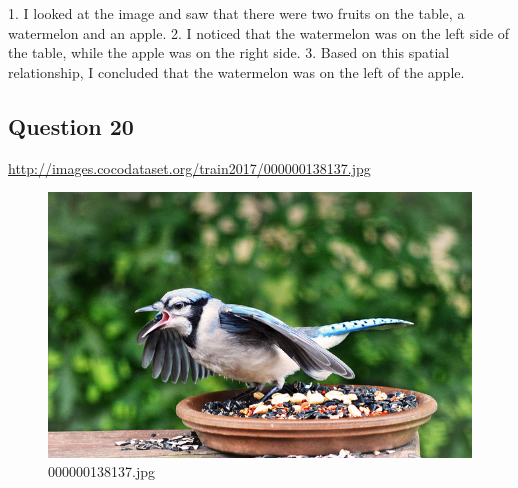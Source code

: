 \begin{enumerate}
        1. I looked at the image and saw that there were two fruits on the table, a watermelon and an apple.
        2. I noticed that the watermelon was on the left side of the table, while the apple was on the right side.
        3. Based on this spatial relationship, I concluded that the watermelon was on the left of the apple.
    \end{enumerate}
\subsection*{Question 20}
\url{http://images.cocodataset.org/train2017/000000138137.jpg}
    \begin{figure}[h]
        \centering
        \includegraphics[width=0.8\linewidth]{../image set/easy/000000138137.jpg}
        \caption{000000138137.jpg}
    \end{figure}

